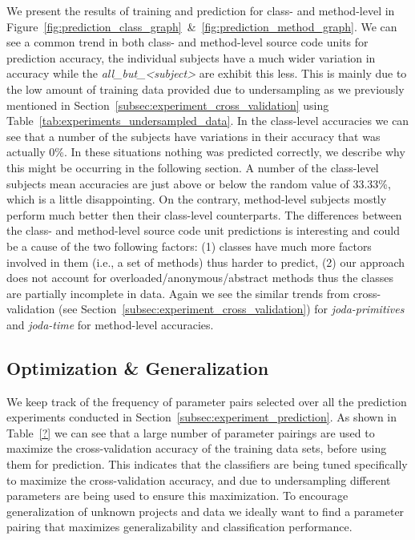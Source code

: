 We present the results of training and prediction for class- and method-level in Figure~\ref{fig:prediction_class_graph}~\&~\ref{fig:prediction_method_graph}. We can see a common trend in both class- and method-level source code units for prediction accuracy, the individual subjects have a much wider variation in accuracy while the \emph{all\_but\_<subject>} are exhibit this less. This is mainly due to the low amount of training data provided due to undersampling as we previously mentioned in Section~\ref{subsec:experiment_cross_validation} using Table~\ref{tab:experiments_undersampled_data}. In the class-level accuracies we can see that a number of the subjects have variations in their accuracy that was actually 0\%. In these situations nothing was predicted correctly, we describe why this might be occurring in the following section. A number of the class-level subjects mean accuracies are just above or below the random value of 33.33\%, which is a little disappointing. On the contrary, method-level subjects mostly perform much better then their class-level counterparts. The differences between the class- and method-level source code unit predictions is interesting and could be a cause of the two following factors: (1) classes have much more factors involved in them (i.e., a set of methods) thus harder to predict, (2) our approach does not account for overloaded/anonymous/abstract methods thus the classes are partially incomplete in data. Again we see the similar trends from cross-validation (see Section~\ref{subsec:experiment_cross_validation}) for \emph{joda-primitives} and \emph{joda-time} for method-level accuracies.


\subsection{Optimization \& Generalization}
\label{subsec:experiment_optimization_generalization}
We keep track of the frequency of parameter pairs selected over all the prediction experiments conducted in Section~\ref{subsec:experiment_prediction}. As shown in Table~\ref{?} we can see that a large number of parameter pairings are used to maximize the cross-validation accuracy of the training data sets, before using them for prediction. This indicates that the classifiers are being tuned specifically to maximize the cross-validation accuracy, and due to undersampling different parameters are being used to ensure this maximization. To encourage generalization of unknown projects and data we ideally want to find a parameter pairing that maximizes generalizability and classification performance.

